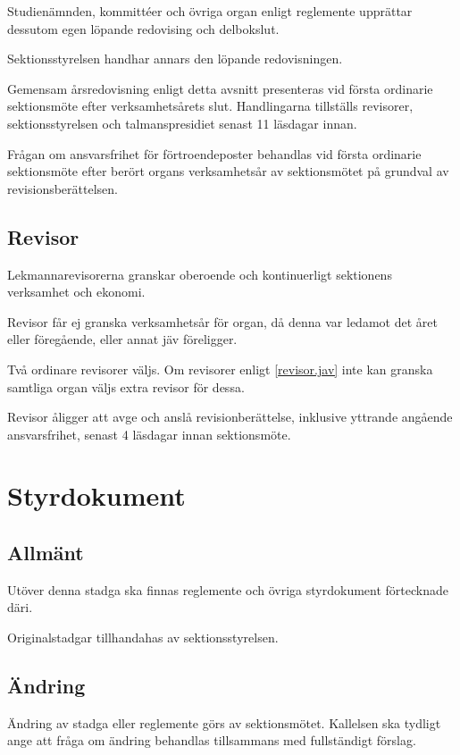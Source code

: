 \documentclass{styrdokument}
\begin{document}
\? Studienämnden, kommittéer och övriga organ enligt reglemente upprättar dessutom egen löpande redovising och delbokslut.

\? Sektionsstyrelsen handhar annars den löpande redovisningen.

\? Gemensam årsredovisning enligt detta avsnitt presenteras vid första ordinarie sektionsmöte efter verksamhetsårets slut.
Handlingarna tillställs revisorer, sektionsstyrelsen och talmanspresidiet senast 11 läsdagar innan.

\? Frågan om ansvarsfrihet för förtroendeposter behandlas vid första ordinarie sektionsmöte efter berört organs verksamhetsår av sektionsmötet på grundval av revisionsberättelsen.

\subsection{Revisor}

\? Lekmannarevisorerna granskar oberoende och kontinuerligt sektionens verksamhet och ekonomi.

\? Revisor får ej granska verksamhetsår för organ, då denna var ledamot det året eller föregående, eller annat jäv föreligger.
\label{revisor.jav}

\? Två ordinare revisorer väljs.
Om revisorer enligt \cref{revisor.jav} inte kan granska samtliga organ väljs extra revisor för dessa.

\? Revisor åligger att avge och anslå revisionberättelse, inklusive yttrande angående ansvarsfrihet, senast 4 läsdagar innan sektionsmöte.

\section{Styrdokument}
\subsection{Allmänt}

\? Utöver denna stadga ska finnas reglemente och övriga styrdokument förtecknade däri.

\? Originalstadgar tillhandahas av sektionsstyrelsen.

\subsection{Ändring}

\? Ändring av stadga eller reglemente görs av sektionsmötet.
Kallelsen ska tydligt ange att fråga om ändring behandlas tillsammans med fullständigt förslag.
\label{beslut.andring.kallelse}
\end{document}
